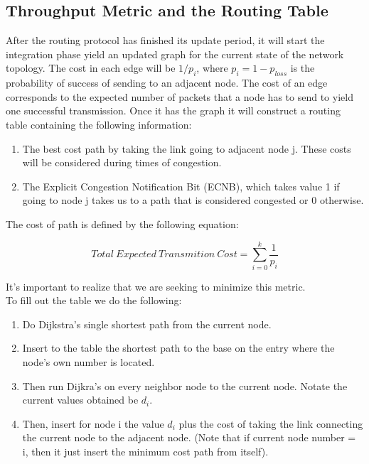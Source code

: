 \documentclass[letterpaper]{article}
\begin{document}
\subsection{Throughput Metric and the Routing Table}

After the routing protocol has finished its update period, it will start the integration phase yield an updated graph for the current state of the network topology. The cost in each edge will be $1/p_{i}$, where $p_{i} = 1 - p_{loss}$ is the probability of success of sending to an adjacent node. The cost of an edge corresponds to the expected number of packets that a node has to send to yield one successful transmission. Once it has the graph it will construct a routing table containing the following information:

\begin{enumerate}
  \item The best cost path by taking the link going to adjacent node j. These costs will be considered during times of congestion.
  \item The Explicit Congestion Notification Bit (ECNB), which takes value 1 if going to node j takes us to a path that is considered congested or 0 otherwise.
\end{enumerate}

The cost of path is defined by the following equation:

$$  Total \ Expected \ Transmition \ Cost = \sum_{i=0}^{k}\frac{1}{p_{i}}$$

It's important to realize that we are seeking to minimize this metric.
\\

To fill out the table we do the following:

\begin{enumerate}
  \item Do Dijkstra's single shortest path from the current node.  
  \item Insert to the table the shortest path to the base on the entry where the node's own number is located.
  \item Then run Dijkra's on every neighbor node to the current node. Notate the current values obtained be $d_{i}$.
  \item Then, insert for node i the value $d_{i}$ plus the cost of taking the link connecting the current node to the adjacent node. (Note that if current node number = i, then it just insert the minimum cost path from itself).
\end{enumerate}
\end{document}
